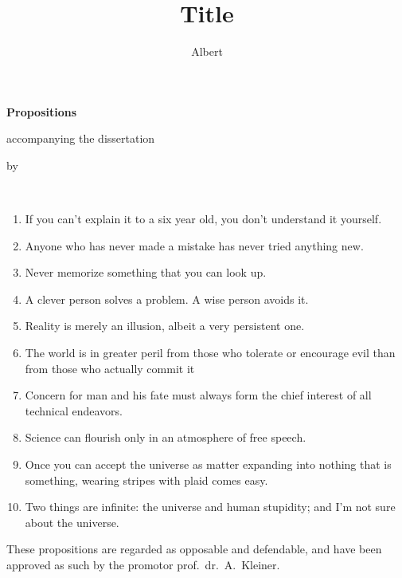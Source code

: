 \documentclass{_style/dissertation}
\title[Optional Subtitle]{Title}
\author{Albert}{Einstein}
\begin{document}
\begin{center}

    {\Huge\titlefont\bfseries Propositions}

    \bigskip

    accompanying the dissertation

    \bigskip

    {\makeatletter
        \color{title}
        \titlestyle\bfseries\huge\@title
        \makeatother}

    {\makeatletter
        \color{title}
        \ifx\@subtitle\undefined\else
            \large\titlefont\titleshape\@subtitle
        \fi
        \makeatother}

    \bigskip

    by

    \bigskip

    \makeatletter
    {\large\titlefont\bfseries\@firstnames\ {\titleshape\@lastname}}
    \makeatother

\end{center}

\bigskip
\bigskip

\begin{enumerate}

\item If you can't explain it to a six year old, you don't understand it yourself.

\item Anyone who has never made a mistake has never tried anything new.

\item Never memorize something that you can look up.

\item A clever person solves a problem. A wise person avoids it.

\item Reality is merely an illusion, albeit a very persistent one.

\item The world is in greater peril from those who tolerate or encourage evil than from those who actually commit it

\item Concern for man and his fate must always form the chief interest of all technical endeavors.

\item Science can flourish only in an atmosphere of free speech.

\item Once you can accept the universe as matter expanding into nothing that is something, wearing stripes with plaid comes easy.

\item Two things are infinite: the universe and human stupidity; and I'm not sure about the universe.

\end{enumerate}

\vfill

\begin{center}
These propositions are regarded as opposable and defendable, and have been approved as such by the promotor prof.\ dr.\ A.\ Kleiner.
\end{center}
\end{document}
